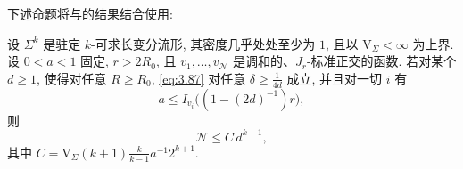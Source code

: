 下述命题将与的结果结合使用:

\begin{proposition}
\label{prop:3.23}
设 $\Sigma^k$ 是驻定 $k$-可求长变分流形, 其密度几乎处处至少为 $1$, 且以
$\mathrm{V}_\Sigma<\infty$ 为上界. 设 $0<a<1$ 固定, $r>2R_0$, 且
$v_1,\dots,v_{\mathcal{N}}$ 是调和的、$J_r$-标准正交的函数. 若对某个
$d\geq1$, 使得对任意 $R\geq R_0$, \eqref{eq:3.87} 对任意
$\delta\geq\frac{1}{4d}$ 成立, 并且对一切 $i$ 有
\begin{equation}
a\leq I_{v_i}\bigl((1-(2d)^{-1})r\bigr),
\label{eq:3.88}
\end{equation}
则
\begin{equation}
\mathcal{N}\leq C\,d^{k-1},
\label{eq:3.89}
\end{equation}
其中 $C=\mathrm{V}_\Sigma(k+1)\frac{k}{k-1}a^{-1}2^{k+1}$.
\end{proposition}

